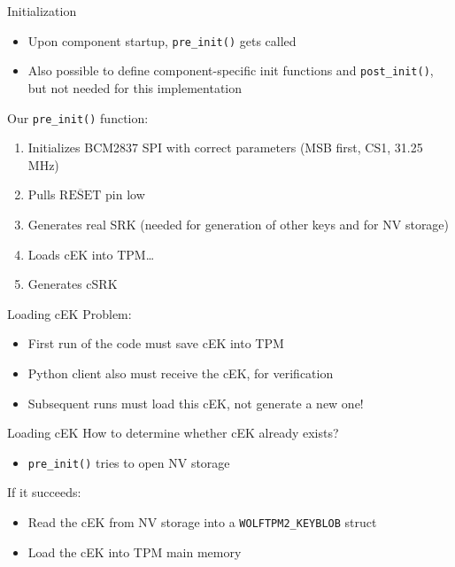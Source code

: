 \begin{frame}{Initialization}
\begin{itemize}
\item Upon component startup, \texttt{pre\_init()} gets called
\item Also possible to define component-specific init functions and \texttt{post\_init()}, but not needed for this implementation
\end{itemize}

Our \texttt{pre\_init()} function:

\begin{enumerate}
\item Initializes BCM2837 SPI with correct parameters (MSB first, CS1, 31.25 MHz)
\item Pulls $\overline{\mbox{RESET}}$ pin low
\item Generates real SRK (needed for generation of other keys and for NV storage)
\item Loads cEK into TPM\ldots
\item Generates cSRK
\end{enumerate}
\end{frame}

\begin{frame}{Loading cEK}
Problem:
\begin{itemize}
\item First run of the code must save cEK into TPM
\item Python client also must receive the cEK, for verification
\item Subsequent runs must load this cEK, not generate a new one!
\end{itemize}
\end{frame}

\begin{frame}{Loading cEK}
How to determine whether cEK already exists?
\begin{itemize}
\item \texttt{pre\_init()} tries to open NV storage
\end{itemize}

If it succeeds:
\begin{itemize}
\item Read the cEK from NV storage into a \texttt{WOLFTPM2\_KEYBLOB} struct
\item Load the cEK into TPM main memory
\end{itemize}
\end{frame}

